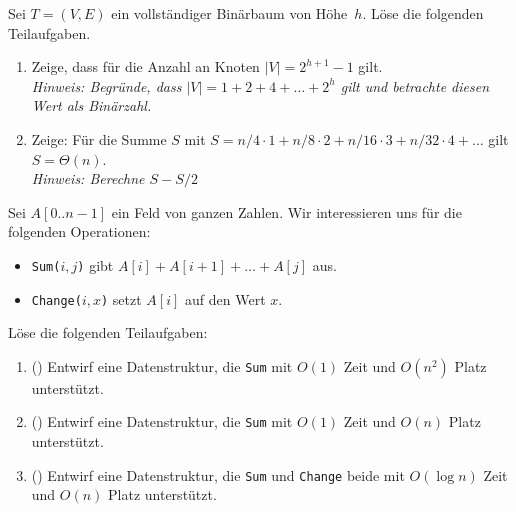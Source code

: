 \documentclass{uebung_cs}
\begin{document}
\begin{aufgabe}
	Sei $T = (V,E)$ ein vollständiger Binärbaum von Höhe~$h$.
	Löse die folgenden Teilaufgaben.
	\begin{enumerate}
		\item Zeige, dass für die Anzahl an Knoten $|V| = 2^{h+1} - 1$ gilt.\\
		\textit{Hinweis: Begründe, dass $|V| = 1 + 2 + 4 + \hdots + 2^h$ gilt und betrachte diesen Wert als Binärzahl.}
		\item Zeige: Für die Summe $S$ mit $S = n / 4 \cdot 1 + n / 8 \cdot 2 + n / 16 \cdot 3 + n / 32 \cdot 4 + \hdots$ gilt $S = \Theta(n)$.\\
		\textit{Hinweis: Berechne $S - S/2$}
	\end{enumerate}
\end{aufgabe}


\begin{aufgabe}[Summen]
	Sei $A[0..n-1]$ ein Feld von ganzen Zahlen.
	Wir interessieren uns für die folgenden Operationen:
	\begin{itemize}
		\item \texttt{Sum($i,j$)} gibt $A[i] + A[i+1] + \hdots + A[j]$ aus.
		\item \texttt{Change($i,x$)} setzt $A[i]$ auf den Wert $x$.
	\end{itemize}
	Löse die folgenden Teilaufgaben:
	\begin{enumerate}
		\item (\warmup) Entwirf eine Datenstruktur, die \texttt{Sum} mit $O(1)$ Zeit und $O(n^2)$ Platz unterstützt.
		\item (\hard) Entwirf eine Datenstruktur, die \texttt{Sum} mit $O(1)$ Zeit und $O(n)$ Platz unterstützt.
		\item (\veryhard) Entwirf eine Datenstruktur, die \texttt{Sum} und \texttt{Change} beide mit $O(\log n)$ Zeit und $O(n)$ Platz unterstützt.
	\end{enumerate}
\end{aufgabe}
\end{document}
